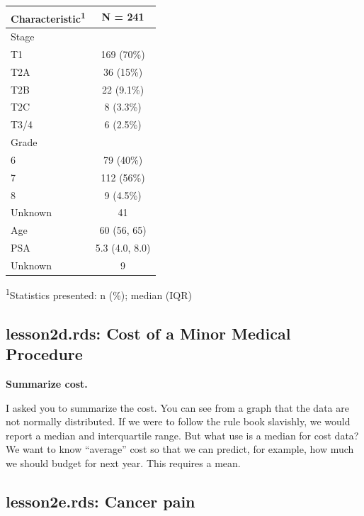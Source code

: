 \documentclass[]{book}
\begin{document}
\captionsetup[table]{labelformat=empty,skip=1pt}
\begin{longtable}{lc}
\toprule
\textbf{Characteristic}\textsuperscript{1} & \textbf{N = 241} \\ 
\midrule
Stage &  \\ 
T1 & 169 (70\%) \\ 
T2A & 36 (15\%) \\ 
T2B & 22 (9.1\%) \\ 
T2C & 8 (3.3\%) \\ 
T3/4 & 6 (2.5\%) \\ 
Grade &  \\ 
6 & 79 (40\%) \\ 
7 & 112 (56\%) \\ 
8 & 9 (4.5\%) \\ 
Unknown & 41 \\ 
Age & 60 (56, 65) \\ 
PSA & 5.3 (4.0, 8.0) \\ 
Unknown & 9 \\ 
\bottomrule
\end{longtable}
\vspace{-5mm}
\begin{minipage}{\linewidth}
\textsuperscript{1}Statistics presented: n (\%); median (IQR) \\ 
\end{minipage}

\hypertarget{lesson2d.rds-cost-of-a-minor-medical-procedure}{%
\subsection{lesson2d.rds: Cost of a Minor Medical Procedure}\label{lesson2d.rds-cost-of-a-minor-medical-procedure}}

\textbf{Summarize cost.}

I asked you to summarize the cost. You can see from a graph that the data are not normally distributed. If we were to follow the rule book slavishly, we would report a median and interquartile range. But what use is a median for cost data? We want to know ``average'' cost so that we can predict, for example, how much we should budget for next year. This requires a mean.

\hypertarget{lesson2e.rds-cancer-pain}{%
\subsection{lesson2e.rds: Cancer pain}\label{lesson2e.rds-cancer-pain}}
\end{document}
